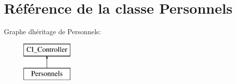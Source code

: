 \hypertarget{class_personnels}{}\section{Référence de la classe Personnels}
\label{class_personnels}
Graphe d\textquotesingle{}héritage de Personnels\+:\begin{figure}[H]
\begin{center}
\leavevmode
\includegraphics[height=2.000000cm]{class_personnels}
\end{center}
\end{figure}

